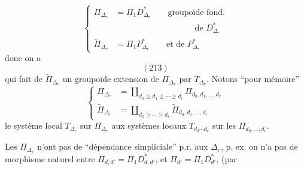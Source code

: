 \[
\tag{212}
\left\{\begin{aligned}
\Pi_{\Delta_r}&=\Pi_1D^*_{\Delta_r}\qquad\text{groupoïde fond.}\\
&\hspace{4cm}\text{de }D^*_{\Delta_r}\\
\widetilde\Pi_{\Delta_r}&=\Pi_1P^*_{\Delta_r}\qquad\text{et de }P^*_{\Delta_r}
\end{aligned}\right.
\]
donc on a
\[
(213)
\]
qui fait de $\widetilde\Pi_{\Delta_r}$ un groupoïde
extension de $\Pi_{\Delta_r}$ par $T_{\Delta_r}$.
Notons ``pour mémoire''
\[
\tag{214}
\left\{\begin{aligned}
\Pi_{\Delta_r}&=\coprod_{d_0\geq d_1\geq\cdots\geq d_r}\Pi_{d_0,d_1,\ldots,d_r}\\
\widetilde\Pi_{\Delta_r}&=\coprod_{d_0\geq\cdots\geq d_r}\widetilde\Pi_{d_0,d_1,\ldots,d_r}
\end{aligned}\right.
\]
le système local $T_{\Delta_r}$ sur $\Pi_{\Delta_r}$ 
 aux systèmes locaux
$T_{d_0\cdots d_r}$ sur les $\Pi_{d_0,\ldots,d_r}$.

Les $\Pi_{\Delta_r}$ n'ont pas de ``dépendance
simpliciale'' p.r. aux $\Delta_r$, p. ex. on n'a
pas de morphisme naturel entre
$\Pi_{d,d'}=\Pi_1D^*_{d,d'}$, et $\Pi_{d'}=\Pi_1D^*_{d'}$, (par
